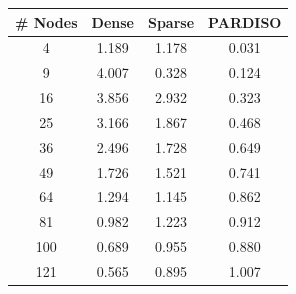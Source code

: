 \documentclass[letterpaper, 10 pt, conference]{ieeeconf}  %
\begin{document}
\begin{figure}
        \begin{minipage}[b]{.45\linewidth}
                \begin{center}
                        \begin{tabular}{|c|c|c|c|}
                        \hline
                        \textbf{\# Nodes} & \multicolumn{1}{c|}{\textbf{Dense}} & \multicolumn{1}{c|}{\textbf{Sparse}} & \multicolumn{1}{c|}{\textbf{PARDISO}} \\ \hline
                        4                 & 1.189                               & 1.178                                & 0.031                                 \\ \hline
                        9                 & 4.007                               & 0.328                                & 0.124                                 \\ \hline
                        16                & 3.856                               & 2.932                                & 0.323                                 \\ \hline
                        25                & 3.166                               & 1.867                                & 0.468                                 \\ \hline
                        36                & 2.496                               & 1.728                                & 0.649                                 \\ \hline
                        49                & 1.726                               & 1.521                                & 0.741                                 \\ \hline
                        64                & 1.294                               & 1.145                                & 0.862                                 \\ \hline
                        81                & 0.982                               & 1.223                                & 0.912                                 \\ \hline
                        100               & 0.689                               & 0.955                                & 0.880                                 \\ \hline
                        121               & 0.565                               & 0.895                                & 1.007                                 \\ \hline

\end{tabular}
\end{center}
\end{minipage}
\end{figure}
\end{document}
